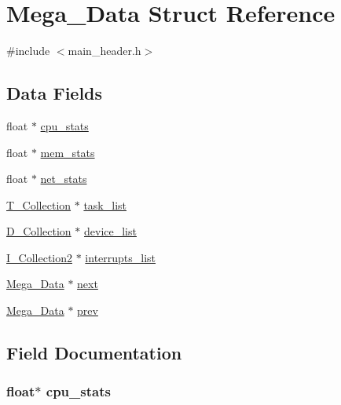 \hypertarget{struct_mega___data}{}\section{Mega\+\_\+\+Data Struct Reference}
\label{struct_mega___data}


{\ttfamily \#include $<$main\+\_\+header.\+h$>$}

\subsection*{Data Fields}
\begin{DoxyCompactItemize}
\item 
float $\ast$ \hyperlink{struct_mega___data_a769f782d80a03eefeaa099313f2698f7}{cpu\+\_\+stats}
\item 
float $\ast$ \hyperlink{struct_mega___data_aebeb719a5ff14f4daa98808f679940e6}{mem\+\_\+stats}
\item 
float $\ast$ \hyperlink{struct_mega___data_a74fb62c49c02bbf4eb4cf245855b7699}{net\+\_\+stats}
\item 
\hyperlink{common_8h_aa9f2ae5a85e60fbcbda672bc74c74e0d}{T\+\_\+\+Collection} $\ast$ \hyperlink{struct_mega___data_a9d1ac7f39078d6fcc7b9d64dce406123}{task\+\_\+list}
\item 
\hyperlink{common_8h_a78fbed7dbe1a9b59fa372944508fa48e}{D\+\_\+\+Collection} $\ast$ \hyperlink{struct_mega___data_a9db847f1a9a234319ce00d74769d0d30}{device\+\_\+list}
\item 
\hyperlink{common_8h_a76ec70ab5b7f9f59daf2ac63d0bd0e80}{I\+\_\+\+Collection2} $\ast$ \hyperlink{struct_mega___data_ae89644db7aed319c811060a886603290}{interrupts\+\_\+list}
\item 
\hyperlink{struct_mega___data}{Mega\+\_\+\+Data} $\ast$ \hyperlink{struct_mega___data_a7ab4e5cb18d7e3077b10457a2c48a3c9}{next}
\item 
\hyperlink{struct_mega___data}{Mega\+\_\+\+Data} $\ast$ \hyperlink{struct_mega___data_a588225306923509db138118efa04bf64}{prev}
\end{DoxyCompactItemize}


\subsection{Field Documentation}
\subsubsection[{\texorpdfstring{cpu\+\_\+stats}{cpu_stats}}]{\setlength{\rightskip}{0pt plus 5cm}float$\ast$ cpu\+\_\+stats}\hypertarget{struct_mega___data_a769f782d80a03eefeaa099313f2698f7}{}\label{struct_mega___data_a769f782d80a03eefeaa099313f2698f7}
